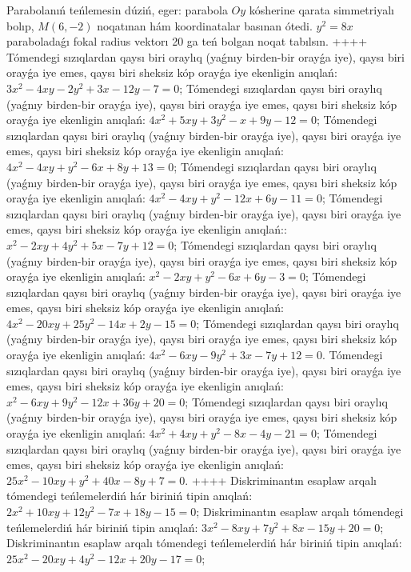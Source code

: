 Parabolanıń teńlemesin dúziń, eger: parabola $O y$ kósherine qarata simmetriyalı bolıp, $M (6,-2) $ noqatınan hám koordinatalar basınan ótedi.
$y^2=8 x$ paraboladaǵı fokal radius vektorı 20 ga teń bolgan noqat tabılsın.
++++
Tómendegi sızıqlardan qaysı biri oraylıq (yaǵnıy birden-bir orayǵa iye), qaysı biri orayǵa iye emes, qaysı biri sheksiz kóp orayǵa iye ekenligin anıqlań: $3 x^2-4 x y-2 y^2+3 x-12 y-7=0$;
Tómendegi sızıqlardan qaysı biri oraylıq (yaǵnıy birden-bir orayǵa iye), qaysı biri orayǵa iye emes, qaysı biri sheksiz kóp orayǵa iye ekenligin anıqlań: $4 x^2+5 x y+3 y^2-x+9 y-12=0$;
Tómendegi sızıqlardan qaysı biri oraylıq (yaǵnıy birden-bir orayǵa iye), qaysı biri orayǵa iye emes, qaysı biri sheksiz kóp orayǵa iye ekenligin anıqlań: $4 x^2-4 x y+y^2-6 x+8 y+13=0$;
Tómendegi sızıqlardan qaysı biri oraylıq (yaǵnıy birden-bir orayǵa iye), qaysı biri orayǵa iye emes, qaysı biri sheksiz kóp orayǵa iye ekenligin anıqlań: $4 x^2-4 x y+y^2-12 x+6 y-11=0$;
Tómendegi sızıqlardan qaysı biri oraylıq (yaǵnıy birden-bir orayǵa iye), qaysı biri orayǵa iye emes, qaysı biri sheksiz kóp orayǵa iye ekenligin anıqlań:: $x^2-2 x y+4 y^2+5 x-7 y+12=0$;
Tómendegi sızıqlardan qaysı biri oraylıq (yaǵnıy birden-bir orayǵa iye), qaysı biri orayǵa iye emes, qaysı biri sheksiz kóp orayǵa iye ekenligin anıqlań:  $x^2-2 x y+y^2-6 x+6 y-3=0$;
Tómendegi sızıqlardan qaysı biri oraylıq (yaǵnıy birden-bir orayǵa iye), qaysı biri orayǵa iye emes, qaysı biri sheksiz kóp orayǵa iye ekenligin anıqlań: $4 x^2-20 x y+25 y^2-14 x+2 y-15=0$;
Tómendegi sızıqlardan qaysı biri oraylıq (yaǵnıy birden-bir orayǵa iye), qaysı biri orayǵa iye emes, qaysı biri sheksiz kóp orayǵa iye ekenligin anıqlań:  $4 x^2-6 x y-9 y^2+3 x-7 y+12=0$.
Tómendegi sızıqlardan qaysı biri oraylıq (yaǵnıy birden-bir orayǵa iye), qaysı biri orayǵa iye emes, qaysı biri sheksiz kóp orayǵa iye ekenligin anıqlań: $x^2-6 x y+9 y^2-12 x+36 y+20=0$;
Tómendegi sızıqlardan qaysı biri oraylıq (yaǵnıy birden-bir orayǵa iye), qaysı biri orayǵa iye emes, qaysı biri sheksiz kóp orayǵa iye ekenligin anıqlań:  $4 x^2+4 x y+y^2-8 x-4 y-21=0$;
Tómendegi sızıqlardan qaysı biri oraylıq (yaǵnıy birden-bir orayǵa iye), qaysı biri orayǵa iye emes, qaysı biri sheksiz kóp orayǵa iye ekenligin anıqlań: $25 x^2-10 x y+y^2+40 x-8 y+7=0$.
++++
Diskriminantın esaplaw arqalı tómendegi teńlemelerdiń hár biriniń tipin anıqlań: $2 x^2+10 x y+12 y^2-7 x+18 y-15=0$;
Diskriminantın esaplaw arqalı tómendegi teńlemelerdiń hár biriniń tipin anıqlań: $3 x^2-8 x y+7 y^2+8 x-15 y+20=0$;
Diskriminantın esaplaw arqalı tómendegi teńlemelerdiń hár biriniń tipin anıqlań: $25 x^2-20 x y+4 y^2-12 x+20 y-17=0$;
